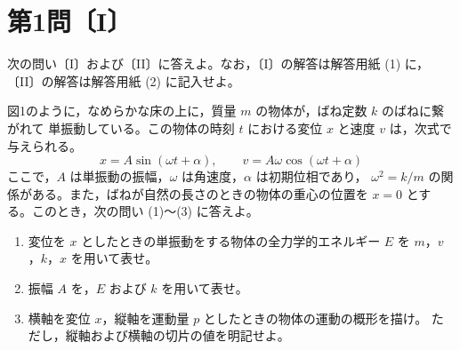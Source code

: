 \section*{第1問〔I〕}

次の問い〔I〕および〔II〕に答えよ。なお，〔I〕の解答は解答用紙 (1) に，
〔II〕の解答は解答用紙 (2) に記入せよ。

\medskip
図1のように，なめらかな床の上に，質量 $m$ の物体が，ばね定数 $k$ のばねに繋がれて
単振動している。この物体の時刻 $t$ における変位 $x$ と速度 $v$ は，次式で与えられる。
\[
  x=A\sin(\omega t+\alpha),\qquad v=A\omega\cos(\omega t+\alpha)
\]
ここで，$A$ は単振動の振幅，$\omega$ は角速度，$\alpha$ は初期位相であり，
$\omega^2=k/m$ の関係がある。また，ばねが自然の長さのときの物体の重心の位置を
$x=0$ とする。このとき，次の問い (1)〜(3) に答えよ。

\begin{enumerate}[label=(\arabic*)]
  \item 変位を $x$ としたときの単振動をする物体の全力学的エネルギー $E$ を
        $m$，$v$，$k$，$x$ を用いて表せ。
  \item 振幅 $A$ を，$E$ および $k$ を用いて表せ。
  \item 横軸を変位 $x$，縦軸を運動量 $p$ としたときの物体の運動の概形を描け。
        ただし，縦軸および横軸の切片の値を明記せよ。
\end{enumerate}

\begin{center}
\end{center}
